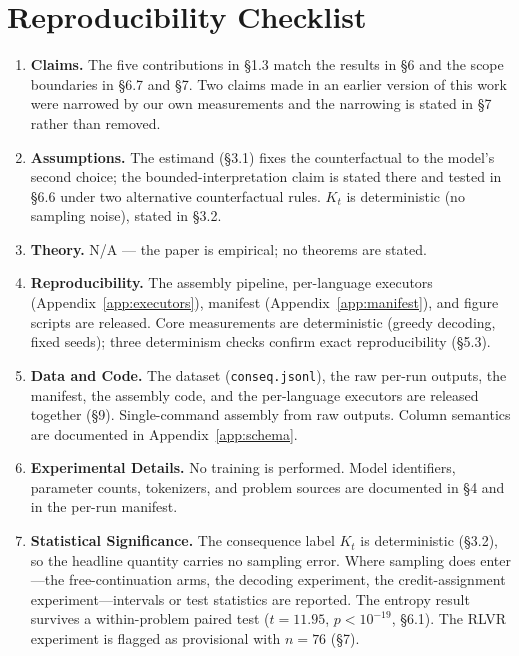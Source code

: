 \section*{Reproducibility Checklist}

\begin{enumerate}
\item \textbf{Claims.} The five contributions in \S1.3 match the results in \S6 and the scope
boundaries in \S6.7 and \S7. Two claims made in an earlier version of this work were narrowed by our
own measurements and the narrowing is stated in \S7 rather than removed.

\item \textbf{Assumptions.} The estimand (\S3.1) fixes the counterfactual to the model's second
choice; the bounded-interpretation claim is stated there and tested in \S6.6 under two alternative
counterfactual rules. $K_t$ is deterministic (no sampling noise), stated in \S3.2.

\item \textbf{Theory.} N/A --- the paper is empirical; no theorems are stated.

\item \textbf{Reproducibility.} The assembly pipeline, per-language executors
(Appendix~\ref{app:executors}), manifest (Appendix~\ref{app:manifest}), and figure scripts are
released. Core measurements are deterministic (greedy decoding, fixed seeds); three determinism checks
confirm exact reproducibility (\S5.3).

\item \textbf{Data and Code.} The dataset (\texttt{conseq.jsonl}), the raw per-run outputs, the
manifest, the assembly code, and the per-language executors are released together (\S9).
Single-command assembly from raw outputs. Column semantics are documented in
Appendix~\ref{app:schema}.

\item \textbf{Experimental Details.} No training is performed. Model identifiers, parameter counts,
tokenizers, and problem sources are documented in \S4 and in the per-run manifest.

\item \textbf{Statistical Significance.} The consequence label $K_t$ is deterministic (\S3.2), so the
headline quantity carries no sampling error. Where sampling does enter---the free-continuation arms,
the decoding experiment, the credit-assignment experiment---intervals or test statistics are
reported. The entropy result survives a within-problem paired test ($t = 11.95$, $p < 10^{-19}$,
\S6.1). The RLVR experiment is flagged as provisional with $n = 76$ (\S7).


\end{enumerate}
